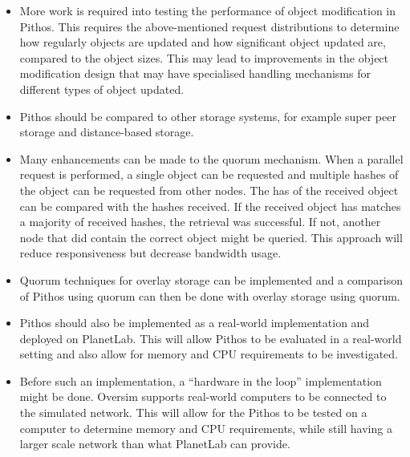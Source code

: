 \begin{itemize}
\item More work is required into testing the performance of object modification in Pithos. This requires the above-mentioned request distributions to determine how regularly objects are updated and how significant object updated are, compared to the object sizes. This may lead to improvements in the object modification design that may have specialised handling mechanisms for different types of object updated.
    
\item Pithos should be compared to other storage systems, for example super peer storage and distance-based storage.

\item Many enhancements can be made to the quorum mechanism. When a parallel request is performed, a single object can be requested and multiple hashes of the object can be requested from other nodes. The has of the received object can be compared with the hashes received. If the received object has matches a majority of received hashes, the retrieval was successful. If not, another node that did contain the correct object might be queried. This approach will reduce responsiveness but decrease bandwidth usage.
    
\item Quorum techniques for overlay storage can be implemented and a comparison of Pithos using quorum can then be done with overlay storage using quorum.

\item Pithos should also be implemented as a real-world implementation and deployed on PlanetLab. This will allow Pithos to be evaluated in a real-world setting and also allow for memory and CPU requirements to be investigated.

\item Before such an implementation, a ``hardware in the loop'' implementation might be done. Oversim supports real-world computers to be connected to the simulated network. This will allow for the Pithos to be tested on a computer to determine memory and CPU requirements, while still having a larger scale network than what PlanetLab can provide.
\end{itemize}
